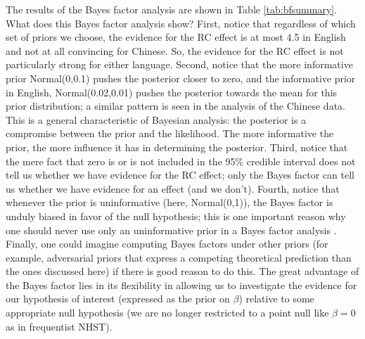 \documentclass{ar-1col}\usepackage[]{graphicx}\usepackage[]{color}
\begin{document}
The results of the Bayes factor analysis are shown in Table \ref{tab:bfsummary}.
What does this Bayes factor analysis show? First, notice that regardless of which set of priors we choose, the evidence for the RC effect is at most 4.5 in English and not at all convincing for Chinese. So, the evidence for the RC effect is not particularly strong for either language. Second, notice that the more informative prior Normal(0,0.1) pushes the posterior closer to zero, and the informative prior in English, Normal(0.02,0.01) pushes the posterior towards the mean for this prior distribution; a similar pattern is seen in the analysis of the Chinese data. This is a general characteristic of Bayesian analysis: the posterior is a compromise between the prior and the likelihood. The more informative the prior, the more influence it has in determining the posterior. Third, notice that the mere fact that zero is or is not included in the 95\% credible interval does not tell us whether we have evidence for the RC effect; only the Bayes factor can tell us whether we have evidence for an effect (and we don't). Fourth, notice that whenever the prior is uninformative (here, Normal(0,1)), the Bayes factor is unduly biased in favor of the null hypothesis; this is one important reason why one should never use only an uninformative prior in a Bayes factor analysis \citep[cf. the advice in articles like][to compute Bayes factors using so-called `default' priors that are uninformative]{wagenmakers2018bayesian2}. Finally, one could imagine computing Bayes factors under other priors (for example, adversarial priors that express a competing theoretical prediction than the ones discussed here) if there is good reason to do this. The great advantage of the Bayes factor lies in its flexibility in allowing us to investigate the evidence for our hypothesis of interest (expressed as the prior on $\beta$) relative to some appropriate null hypothesis (we are no longer restricted to a point null like $\beta=0$ as in  frequentist NHST).

\begin{marginnote}[]
\end{marginnote}
\end{document}

